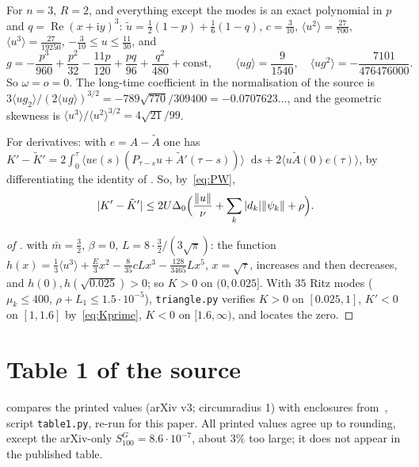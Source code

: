 \documentclass[11pt,a4paper]{report}
\DeclareRobustCommand*{\avg}[1]{\langle #1\rangle}
\DeclareRobustCommand*{\norm}[1]{\lVert #1\rVert}
\DeclareRobustCommand*{\ut}{\tilde u}
\DeclareRobustCommand*{\dd}{\mathop{}\!\mathrm{d}}
\begin{document}
For \(n=3\), \(R=2\), and everything except the modes is an exact polynomial in \(p\) and \(q=\operatorname{Re}(x+\mathrm iy)^3\):
\(\ut=\frac12(1-p)+\frac16(1-q)\), \(c=\frac3{10}\), \(\avg{u^2}=\frac{27}{700}\), \(\avg{u^3}=\frac{27}{19250}\), \(-\frac3{10}\le u\le\frac{11}{30}\), and
\[
g=-\frac{p^3}{960}+\frac{p^2}{32}-\frac{11p}{120}+\frac{pq}{96}+\frac{q^2}{480}+\text{const},\qquad\avg{ug}=\frac9{1540},\quad\avg{ug^2}=-\frac{7101}{476476000}.
\]
So \(\omega=o=0\). The long-time coefficient in the normalisation of the source is \(3\avg{ug_2}/(2\avg{ug})^{3/2}=-789\sqrt{770}/309400=-0.0707623\dots\), and the geometric skewness is
\(\avg{u^3}/\avg{u^2}^{3/2}=4\sqrt{21}/99\).

For derivatives: with \(e=A-\tilde A\) one has
\(K'-\tilde K'=2\int_0^\tau\avg{ue(s)(P_{\tau-s}u+\tilde A'(\tau-s))}\dd s+2\avg{u\tilde A(0)e(\tau)}\), by differentiating the identity of . So, by~\eqref{eq:PW},
\begin{equation}\label{eq:Kprime}
|K'-\tilde K'|\le2U\Delta_0\Bigl(\frac{\norm u}\nu+\sum_k|d_k|\norm{\psi_k}+\rho\Bigr).
\end{equation}
\begin{proof}[of ]
 with \(\bar m=\frac32\), \(\beta=0\), \(L=8\cdot\frac32/(3\sqrt\pi)\): the function
\(h(x)=\frac13\avg{u^3}+\frac E3x^2-\frac8{35}cLx^3-\frac{128}{3465}Lx^5\), \(x=\sqrt\tau\), increases and then decreases, and \(h(0),h(\sqrt{0.025})>0\); so \(K>0\) on \((0,0.025]\). With
\(35\) Ritz modes (\(\mu_k\le400\), \(\rho+L_1\le1.5\cdot10^{-5}\)), \texttt{triangle.py} verifies \(K>0\) on \([0.025,1]\), \(K'<0\) on \([1,1.6]\) by~\eqref{eq:Kprime}, \(K<0\) on \([1.6,\infty)\), and locates the zero.
\end{proof}

\section{Table 1 of the source}\label{sec:table}

 compares the printed values (arXiv v3; circumradius 1) with enclosures from~\autocite{Result14}, script \texttt{table1.py}, re-run for this paper. All printed values agree up to rounding, except the arXiv-only
\(S^G_{100}=8.6\cdot10^{-7}\), about 3\% too large; it does not appear in the published table.
\end{document}
